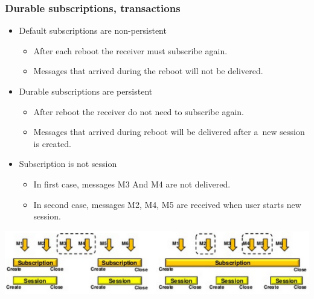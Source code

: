 \documentclass[10pt,xcolor=pdflatex]{beamer}
\begin{document}
\begin{frame}[containsverbatim]\frametitle{Durable subscriptions, transactions}
\begin{itemize}
	\item Default subscriptions are non-persistent
	  \begin{itemize}
		\item After each reboot the receiver must subscribe again.
		\item Messages that arrived during the reboot will not be delivered.
	  \end{itemize}
    \item Durable subscriptions are persistent
	  \begin{itemize}
		\item After reboot the receiver do not need to subscribe again.
		\item Messages that arrived during reboot will be delivered after a~new session is created.
	  \end{itemize}
    \item Subscription is not session
	  \begin{itemize}
		\item In first case, messages M3 And M4 are not delivered.
        \item In second case, messages M2, M4, M5 are received when user starts new session.
	  \end{itemize}
\end{itemize}
\begin{center}
\includegraphics[scale=0.31]{img/obr7}
\end{center}
\end{frame}
\end{document}
